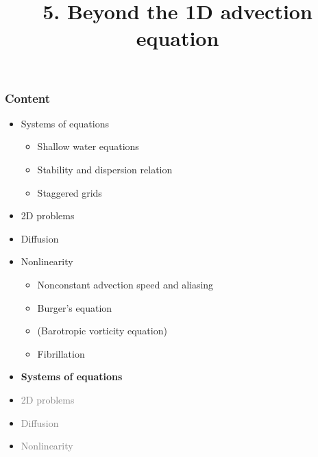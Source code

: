 \documentclass[aspectratio=149,9pt]{beamer}
\title{5. Beyond the 1D advection equation}%
\begin{document}
%
%
\begin{frame}[plain]
	\titlepage
\end{frame}
%
%
\begin{frame}
	\frametitle{Content}
	\begin{itemize}
		\item Systems of equations
			\begin{itemize}
				\item Shallow water equations
				\item Stability and dispersion relation
				\item Staggered grids
			\end{itemize}
		\item 2D problems
		\item Diffusion
		\item Nonlinearity
			\begin{itemize}
				\item Nonconstant advection speed and aliasing
				\item Burger's equation
				\item (Barotropic vorticity equation)
				\item Fibrillation
			\end{itemize}
	\end{itemize}
\end{frame}
%
%
\begin{frame}
	\begin{itemize}
		\item {\bfseries Systems of equations}
		\item \textcolor{gray}{2D problems}
		\item \textcolor{gray}{Diffusion}
		\item \textcolor{gray}{Nonlinearity}
	\end{itemize}
\end{frame}
%
%
\end{document}
